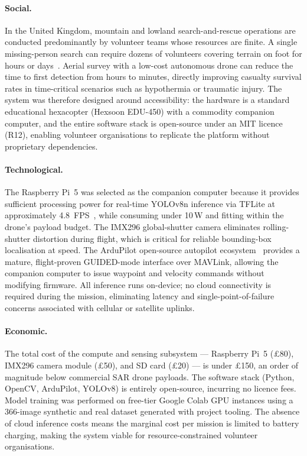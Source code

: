 \paragraph{Social.}
In the United Kingdom, mountain and lowland search-and-rescue operations are conducted predominantly by volunteer teams whose resources are finite. A single missing-person search can require dozens of volunteers covering terrain on foot for hours or days~\cite{sarh2024stats}. Aerial survey with a low-cost autonomous drone can reduce the time to first detection from hours to minutes, directly improving casualty survival rates in time-critical scenarios such as hypothermia or traumatic injury. The system was therefore designed around accessibility: the hardware is a standard educational hexacopter (Hexsoon EDU-450) with a commodity companion computer, and the entire software stack is open-source under an MIT licence (R12), enabling volunteer organisations to replicate the platform without proprietary dependencies.

\paragraph{Technological.}
The Raspberry Pi~5 was selected as the companion computer because it provides sufficient processing power for real-time YOLOv8n inference via TFLite at approximately 4.8~FPS~\cite{yolov8}, while consuming under 10\,W and fitting within the drone's payload budget. The IMX296 global-shutter camera eliminates rolling-shutter distortion during flight, which is critical for reliable bounding-box localisation at speed. The ArduPilot open-source autopilot ecosystem~\cite{ardupilot} provides a mature, flight-proven GUIDED-mode interface over MAVLink, allowing the companion computer to issue waypoint and velocity commands without modifying firmware. All inference runs on-device; no cloud connectivity is required during the mission, eliminating latency and single-point-of-failure concerns associated with cellular or satellite uplinks.

\paragraph{Economic.}
The total cost of the compute and sensing subsystem --- Raspberry Pi~5 (\pounds80), IMX296 camera module (\pounds50), and SD card (\pounds20) --- is under \pounds150, an order of magnitude below commercial SAR drone payloads. The software stack (Python, OpenCV, ArduPilot, YOLOv8) is entirely open-source, incurring no licence fees. Model training was performed on free-tier Google Colab GPU instances using a 366-image synthetic and real dataset generated with project tooling. The absence of cloud inference costs means the marginal cost per mission is limited to battery charging, making the system viable for resource-constrained volunteer organisations.

